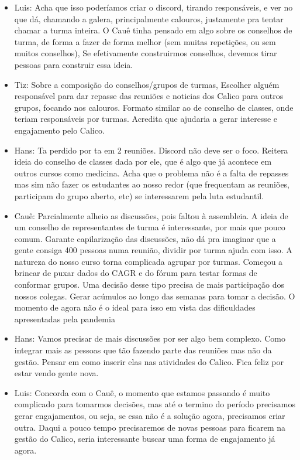 \documentclass{ata-calico}
\begin{document}
\begin{itemize}
\item Luis: Acha que isso poderíamos criar o discord, tirando responsáveis, e ver no que dá, chamando a galera, principalmente calouros, justamente pra tentar chamar a turma inteira. O Cauê tinha  pensado em algo sobre os conselhos de turma, de forma a fazer de forma melhor (sem muitas repetições, ou sem muitos conselhos), Se efetivamente construirmos conselhos, devemos tirar pessoas para construir essa ideia.

\item Tiz: Sobre a composição do conselhos/grupos de turmas, Escolher alguém responsável para dar repasse das reuniões e noticias dos Calico para outros grupos, focando nos calouros. Formato similar ao de conselho de classes, onde teriam responsáveis por turmas. Acredita que ajudaria a gerar interesse e engajamento pelo Calico.

\item Hans: Ta perdido por ta em 2 reuniões. Discord não deve ser o foco. Reitera ideia do conselho de classes dada por ele, que é algo que já acontece em outros cursos como medicina. Acha que o problema não é a falta de repasses mas sim não fazer os estudantes ao nosso redor (que frequentam as reuniões, participam do grupo aberto, etc) se interessarem pela luta estudantil.

\item Cauê: Parcialmente alheio as discussões, pois faltou à assembleia. A ideia de um conselho de representantes de turma é interessante, por mais que pouco comum. Garante capilarização das discussões, não dá pra imaginar que a gente consiga 400 pessoas numa reunião, dividir por turma ajuda com isso. A natureza do nosso curso torna complicada agrupar por turmas. Começou a brincar de puxar dados do CAGR e do fórum para testar formas de conformar  grupos. Uma decisão desse tipo precisa de mais participação dos nossos colegas. Gerar acúmulos ao longo das semanas para tomar a decisão. O momento de agora não é o ideal para isso em vista das dificuldades apresentadas pela pandemia

\item Hans: Vamos precisar de mais discussões por ser algo bem complexo. Como integrar mais as pessoas que tão fazendo parte das reuniões mas não da gestão. Pensar em como inserir elas nas atividades do Calico. Fica feliz por estar vendo gente nova.

\item Luis: Concorda com o Cauê, o momento que estamos passando é muito complicado para tomarmos decisões, mas até o termino do período precisamos gerar engajamentos, ou seja, se essa não é a solução agora, precisamos criar outra. Daqui a pouco tempo precisaremos de novas pessoas para ficarem na gestão do Calico, seria interessante buscar uma forma de engajamento já agora.


\end{itemize}
\end{document}
